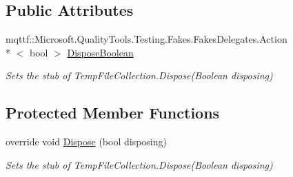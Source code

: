 \subsection*{Public Attributes}
\begin{DoxyCompactItemize}
\item 
mqttf\-::\-Microsoft.\-Quality\-Tools.\-Testing.\-Fakes.\-Fakes\-Delegates.\-Action\\*
$<$ bool $>$ \hyperlink{class_system_1_1_code_dom_1_1_compiler_1_1_fakes_1_1_stub_temp_file_collection_a481d78d602c73edb34630cd004ab534b}{Dispose\-Boolean}
\begin{DoxyCompactList}\small\item\em Sets the stub of Temp\-File\-Collection.\-Dispose(\-Boolean disposing)\end{DoxyCompactList}\end{DoxyCompactItemize}
\subsection*{Protected Member Functions}
\begin{DoxyCompactItemize}
\item 
override void \hyperlink{class_system_1_1_code_dom_1_1_compiler_1_1_fakes_1_1_stub_temp_file_collection_ae5b0c4102f39ce3dd630008f2df6dec9}{Dispose} (bool disposing)
\begin{DoxyCompactList}\small\item\em Sets the stub of Temp\-File\-Collection.\-Dispose(\-Boolean disposing)\end{DoxyCompactList}\end{DoxyCompactItemize}
